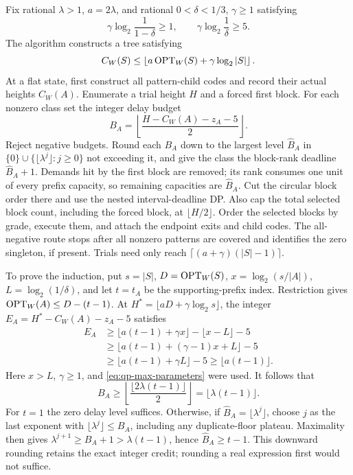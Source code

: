 Fix rational $\lambda>1$, $a=2\lambda$, and rational
$0<\delta<1/3$, $\gamma\ge1$ satisfying
\begin{equation}\label{eq:qp-max-parameters}
 \gamma\log_2\frac1{1-\delta}\ge1,\qquad
 \gamma\log_2\frac1\delta\ge5.
\end{equation}
The algorithm constructs a tree satisfying
\begin{equation}\label{eq:qp-max-induction}
 C_W(S)\le\left\lfloor a\operatorname{OPT}_W(S)+\gamma\log_2|S|\right\rfloor.
\end{equation}
At a flat state, first construct all pattern-child codes and record
their actual heights $C_W(A)$. Enumerate a trial height $H$ and a
forced first block. For each nonzero class set the integer delay budget
\[
 B_A=\left\lfloor\frac{H-C_W(A)-z_A-5}{2}\right\rfloor.
\]
Reject negative budgets. Round each $B_A$ down to the largest level
$\widehat B_A$ in $\{0\}\cup\{\lfloor\lambda^j\rfloor:j\ge0\}$
not exceeding it, and give the class the block-rank deadline
$\widehat B_A+1$. Demands hit by the first block are removed; its
rank consumes one unit of every prefix capacity, so remaining
capacities are $\widehat B_A$. Cut the circular block order there
and use the nested interval-deadline DP. Also cap the total selected
block count, including the forced block, at $\lfloor H/2\rfloor$.
Order the selected blocks by grade, execute them, and attach the
endpoint exits and child codes. The all-negative route stops after
all nonzero patterns are covered and identifies the zero singleton,
if present. Trials need only reach
$\lceil(a+\gamma)(|S|-1)\rceil$.

To prove the induction, put $s=|S|$, $D=\operatorname{OPT}_W(S)$,
$x=\log_2(s/|A|)$, $L=\log_2(1/\delta)$, and let $t=t_A$ be the
supporting-prefix index. Restriction gives
$\operatorname{OPT}_W(A)\le D-(t-1)$. At
$H^*=\lfloor aD+\gamma\log_2s\rfloor$, the integer
$E_A=H^*-C_W(A)-z_A-5$ satisfies
\begin{align*}
 E_A&\ge\lfloor a(t-1)+\gamma x\rfloor-\lfloor x-L\rfloor-5\\
 &\ge\lfloor a(t-1)+(\gamma-1)x+L\rfloor-5\\
 &\ge\lfloor a(t-1)+\gamma L\rfloor-5
 \ge\lfloor a(t-1)\rfloor.
\end{align*}
Here $x>L$, $\gamma\ge1$, and \eqref{eq:qp-max-parameters} were
used. It follows that
\[
 B_A\ge\left\lfloor\frac{\lfloor2\lambda(t-1)\rfloor}{2}\right\rfloor
 =\lfloor\lambda(t-1)\rfloor.
\]
For $t=1$ the zero delay level suffices. Otherwise, if
$\widehat B_A=\lfloor\lambda^j\rfloor$, choose $j$ as the last
exponent with $\lfloor\lambda^j\rfloor\le B_A$, including any
duplicate-floor plateau. Maximality then gives
$\lambda^{j+1}\ge B_A+1>\lambda(t-1)$, hence
$\widehat B_A\ge t-1$. This downward rounding retains the exact
integer credit; rounding a real expression first would not suffice.

